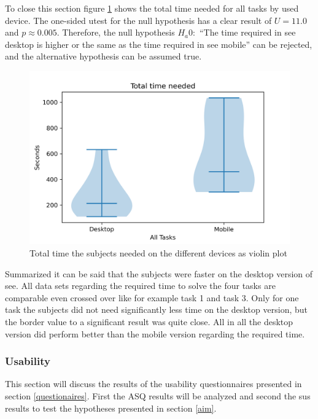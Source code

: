 To close this section figure \ref{fig:device_time_violin} shows the total time needed for all tasks by used device.
The one-sided \gls{utest} for the null hypothesis has a clear result of $U=11.0$ and $p \approx 0.005$.
Therefore, the null hypothesis $H_a0:$ \enquote{The time required in \gls{see} desktop is higher
or the same as the time required in see mobile} can be rejected, and the alternative hypothesis can be assumed true.

\begin{figure}[htb]
  \centering
  \includegraphics*[width=1\textwidth]{Evaluation/img/device_time_violin.png}
  \caption{Total time the subjects needed on the different devices as violin plot}
  \label{fig:device_time_violin}
\end{figure}

Summarized it can be said that the subjects were faster on the desktop version of \gls{see}.
All data sets regarding the required time to solve the four tasks are comparable even crossed over like for example task 1 and task 3. 
Only for one task the subjects did not need significantly less time on the desktop version, but the border value to a significant result was quite close.
All in all the desktop version did perform better than the mobile version regarding the required time.

\subsubsection{Usability}
This section will discuss the results of the usability questionnaires presented in section \ref{questionaires}.
First the \gls{ASQ} results will be analyzed and second the \gls{sus} results to test the hypotheses presented in section \ref{aim}.
